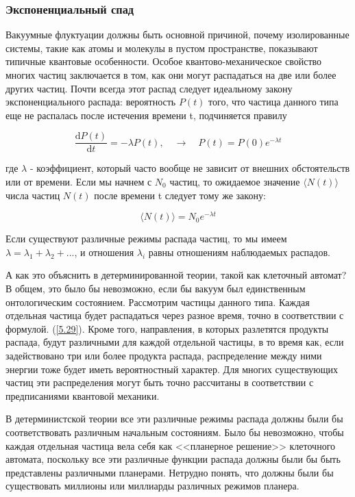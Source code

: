 \documentclass[main.tex]{subfiles}
\begin{document}
\subsubsection{Экспоненциальный спад}\label{ch5.7.7}

Вакуумные флуктуации должны быть основной причиной, почему изолированные системы, такие как атомы и молекулы в пустом пространстве, показывают типичные квантовые особенности. Особое квантово-механическое свойство многих частиц заключается в том, как они могут распадаться на две или более других частиц. Почти всегда этот распад следует идеальному закону экспоненциального распада: вероятность $P(t)$ того, что частица данного типа еще не распалась после истечения времени t, подчиняется правилу

\begin{equation}\label{5.29}
	\frac{\mathrm{d} P(t)}{\mathrm{d} t}=-\lambda P(t), \quad \rightarrow \quad P(t)=P(0) e^{-\lambda t}
\end{equation}
                        
где $\lambda$ - коэффициент, который часто вообще не зависит от внешних обстоятельств или от времени. Если мы начнем с $N_0$ частиц, то ожидаемое значение $\langle N(t) \rangle$ числа частиц $N (t)$ после времени t следует тому же закону:


\begin{equation}\label{5.30}
	\langle N(t) \rangle = N_0 e^{-\lambda t}
\end{equation}

             
Если существуют различные режимы распада частиц, то мы имеем $\lambda = \lambda_1 + \lambda_2 + ...$, и отношения $\lambda_i$ равны отношениям наблюдаемых распадов.

А как это объяснить в детерминированной теории, такой как клеточный автомат? В общем, это было бы невозможно, если бы вакуум был единственным онтологическим состоянием. Рассмотрим частицы данного типа. Каждая отдельная частица будет распадаться через разное время, точно в соответствии с формулой. (\ref{5.29}). Кроме того, направления, в которых разлетятся продукты распада, будут различными для каждой отдельной частицы, в то время как, если задействовано три или более продукта распада, распределение между ними энергии тоже будет иметь вероятностный характер. Для многих существующих частиц эти распределения могут быть точно рассчитаны в соответствии с предписаниями квантовой механики.

В детерминистской теории все эти различные режимы распада должны были бы соответствовать различным начальным состояниям. Было бы невозможно, чтобы каждая отдельная частица вела себя как <<планерное решение>> клеточного автомата, поскольку все эти различные функции распада должны были бы быть представлены различными планерами. Нетрудно понять, что должны были бы существовать миллионы или миллиарды различных режимов планера.
\end{document}
